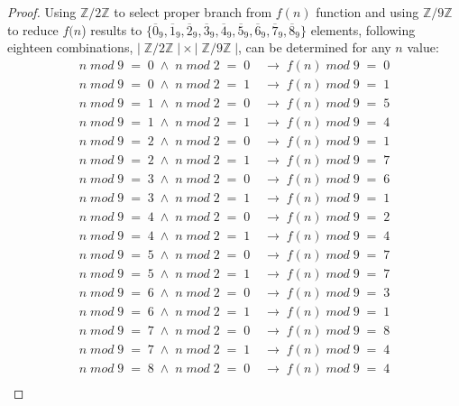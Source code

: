 \documentclass{jams-l}
\theoremstyle{definition}
\theoremstyle{remark}
\numberwithin{equation}{section}
\begin{document}
    	\begin{proof}
    		Using $\mathbb{Z}/2\mathbb{Z}$ to select proper branch from $f(n)$ function and using $\mathbb{Z}/9\mathbb{Z}$ to reduce $f(n$) results to $\{\overline{0}_9, \overline{1}_9, \overline{2}_9, \overline{3}_9, \overline{4}_9, \overline{5}_9, \overline{6}_9, \overline{7}_9, \overline{8}_9\}$ elements, following eighteen combinations, $|\;\mathbb{Z}/2\mathbb{Z}\;|\times|\;\mathbb{Z}/9\mathbb{Z}\;|$, can be determined for any $n$ value:
    		\begin{align}
    			n\;mod\;9\;=\;0\;\land\;n\;mod\;2\;=\;0\;&\longrightarrow\;f(n)\;mod\;9\;=\;0\\
    			n\;mod\;9\;=\;0\;\land\;n\;mod\;2\;=\;1\;&\longrightarrow\;f(n)\;mod\;9\;=\;1\\
    			n\;mod\;9\;=\;1\;\land\;n\;mod\;2\;=\;0\;&\longrightarrow\;f(n)\;mod\;9\;=\;5\\
    			n\;mod\;9\;=\;1\;\land\;n\;mod\;2\;=\;1\;&\longrightarrow\;f(n)\;mod\;9\;=\;4\\
    			n\;mod\;9\;=\;2\;\land\;n\;mod\;2\;=\;0\;&\longrightarrow\;f(n)\;mod\;9\;=\;1\\
    			n\;mod\;9\;=\;2\;\land\;n\;mod\;2\;=\;1\;&\longrightarrow\;f(n)\;mod\;9\;=\;7\\
    			n\;mod\;9\;=\;3\;\land\;n\;mod\;2\;=\;0\;&\longrightarrow\;f(n)\;mod\;9\;=\;6\\
    			n\;mod\;9\;=\;3\;\land\;n\;mod\;2\;=\;1\;&\longrightarrow\;f(n)\;mod\;9\;=\;1\\
    			n\;mod\;9\;=\;4\;\land\;n\;mod\;2\;=\;0\;&\longrightarrow\;f(n)\;mod\;9\;=\;2\\
    			n\;mod\;9\;=\;4\;\land\;n\;mod\;2\;=\;1\;&\longrightarrow\;f(n)\;mod\;9\;=\;4\\
    			n\;mod\;9\;=\;5\;\land\;n\;mod\;2\;=\;0\;&\longrightarrow\;f(n)\;mod\;9\;=\;7\\
    			n\;mod\;9\;=\;5\;\land\;n\;mod\;2\;=\;1\;&\longrightarrow\;f(n)\;mod\;9\;=\;7\\
    			n\;mod\;9\;=\;6\;\land\;n\;mod\;2\;=\;0\;&\longrightarrow\;f(n)\;mod\;9\;=\;3\\
    			n\;mod\;9\;=\;6\;\land\;n\;mod\;2\;=\;1\;&\longrightarrow\;f(n)\;mod\;9\;=\;1\\
    			n\;mod\;9\;=\;7\;\land\;n\;mod\;2\;=\;0\;&\longrightarrow\;f(n)\;mod\;9\;=\;8\\
    			n\;mod\;9\;=\;7\;\land\;n\;mod\;2\;=\;1\;&\longrightarrow\;f(n)\;mod\;9\;=\;4\\
    			n\;mod\;9\;=\;8\;\land\;n\;mod\;2\;=\;0\;&\longrightarrow\;f(n)\;mod\;9\;=\;4\\

\end{align}
\end{proof}
\end{document}

